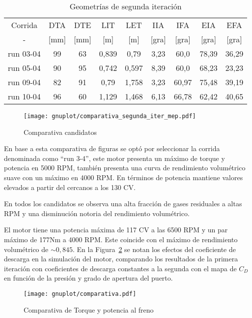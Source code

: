 \begin{table} \centering
  \begin{tabular}{ccccccccc}\toprule
    Corrida   & DTA   & DTE & LIT   & LET   & IIA   & IFA   & EIA    & EFA \\
    -         & [mm] & [mm] & [m]   & [m]   & [gra] & [gra] & [gra]  & [gra] \\ \midrule
    run 03-04 & 99   & 63   & 0,839 & 0,79  & 3,23 & 60,0   & 78,39  & 36,29 \\
    run 05-04 & 90   & 95   & 0,742 & 0,597 & 8,39 & 60,0   & 68,23  & 23,23 \\
    run 09-04 & 82   & 91   & 0,79  & 1,758 & 3,23 & 60,97  & 75,48  & 39,19 \\
    run 10-04 & 96   & 60   & 1,129 & 1,468 & 6,13 & 66,78  & 62,42  & 40,65 \\ \bottomrule
  \end{tabular}
  \caption{Geometrías de segunda iteración}\label{tab:2iter_geom}
\end{table}

\begin{figure} \centering
\texttt{[image: gnuplot/comparativa\_segunda\_iter\_mep.pdf]}
  \caption{Comparativa candidatos} \label{fig:comparativa_segunda_iter}
\end{figure}

En base a esta comparativa de figuras se optó por seleccionar la corrida
denominada como ``run 3-4'', este motor presenta un máximo de torque y potencia
en 5000 RPM, también presenta una curva de rendimiento volumétrico suave con un
máximo en 4000 RPM.
%
En términos de potencia mantiene valores elevados a partir del cercanos a los
130 CV.
%

En todos los candidatos se observa una alta fracción de gases residuales a altas
RPM y una disminución notoria del rendimiento volumétrico.

El motor tiene una potencia máxima de 117 CV a las 6500 RPM y un par máximo de
177Nm a 4000 RPM.
%
Este coincide con el máximo de rendimiento volumétrico de $\sim 0,845$.
%
En la Figura~\ref{fig:PoTi_segunda_op} se notan los efectos del coeficiente de
descarga en la simulación del motor, comparando los resultados de la primera
iteración con coeficientes de descarga constantes a la segunda con el mapa de
$C_{D}$ en función de la presión y grado de apertura del puerto.

\begin{figure}[h!]
  \centering
  \texttt{[image: gnuplot/comparativa.pdf]}
  \caption{Comparativa de Torque y potencia al freno} \label{fig:PoTi_segunda_op}
\end{figure}
